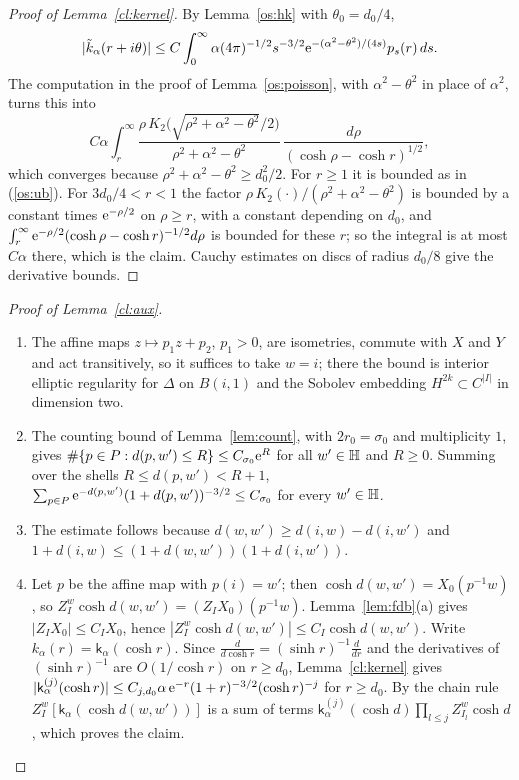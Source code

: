 \begin{proof}[Proof of Lemma~\ref{cl:kernel}]
By Lemma~\ref{os:hk} with $\theta_0=d_0/4$,
\[
|\tilde k_\alpha(r+i\theta)|\le C\int_0^\infty\alpha(4\pi)^{-1/2}s^{-3/2}\mathrm{e}^{-(\alpha^2-\theta^2)/(4s)}p_s(r)\,ds .
\]
The computation in the proof of Lemma~\ref{os:poisson}, with $\alpha^2-\theta^2$ in place of $\alpha^2$, turns this into
\[
C\alpha\int_r^\infty\frac{\rho\,K_2\bigl(\sqrt{\rho^2+\alpha^2-\theta^2}/2\bigr)}{\rho^2+\alpha^2-\theta^2}\,\frac{d\rho}{(\cosh\rho-\cosh r)^{1/2}},
\]
which converges because $\rho^2+\alpha^2-\theta^2\ge d_0^2/2$. For $r\ge1$ it is bounded as in \textup{(\ref{os:ub})}. For $3d_0/4<r<1$ the factor
$\rho\,K_2(\cdot)/(\rho^2+\alpha^2-\theta^2)$ is bounded by a constant times $\mathrm{e}^{-\rho/2}$ on $\rho\ge r$, with a constant depending on $d_0$, and
$\int_r^\infty\mathrm{e}^{-\rho/2}(\cosh\rho-\cosh r)^{-1/2}d\rho$ is bounded for these $r$; so the integral is at most $C\alpha$ there, which is the claim. Cauchy estimates on discs of radius $d_0/8$ give the derivative bounds.
\end{proof}

\begin{proof}[Proof of Lemma~\ref{cl:aux}]
\begin{enumerate}
\item[(a)] The affine maps $z\mapsto p_1z+p_2$,
$p_1>0$, are isometries, commute with $X$ and $Y$ and act transitively, so it suffices to take $w=i$; there the bound is interior elliptic regularity for
$\Delta$ on $B(i,1)$ and the Sobolev embedding $H^{2k}\subset C^{|I|}$ in dimension two.
\item[(b)] The counting bound of Lemma~\ref{lem:count}, with $2r_0=\sigma_0$ and multiplicity $1$, gives $\#\{p\in P:d(p,w')\le R\}\le C_{\sigma_0}\mathrm{e}^R$
for all $w'\in\mathbb{H}$ and $R\ge0$. Summing over the shells
$R\le d(p,w')<R+1$, $\sum_{p\in P}\mathrm{e}^{-d(p,w')}(1+d(p,w'))^{-3/2}\le C_{\sigma_0}$ for every $w'\in\mathbb{H}$.
\item[(c)] The estimate follows because $d(w,w')\ge d(i,w)-d(i,w')$ and
$1+d(i,w)\le(1+d(w,w'))(1+d(i,w'))$.
\item[(d)] Let $p$ be the affine map with $p(i)=w'$; then
$\cosh d(w,w')=X_0(p^{-1}w)$, so $Z_I^w\cosh d(w,w')=(Z_IX_0)(p^{-1}w)$. Lemma~\ref{lem:fdb}(a) gives $|Z_IX_0|\le C_IX_0$, hence $|Z_I^w\cosh d(w,w')|\le C_I\cosh d(w,w')$. Write $k_\alpha(r)=\mathsf k_\alpha(\cosh r)$. Since
$\tfrac{d}{d\cosh r}=(\sinh r)^{-1}\tfrac d{dr}$ and the derivatives of $(\sinh r)^{-1}$ are $O(1/\cosh r)$ on $r\ge d_0$, Lemma~\ref{cl:kernel} gives
$|\mathsf k_\alpha^{(j)}(\cosh r)|\le C_{j,d_0}\alpha\,\mathrm{e}^{-r}(1+r)^{-3/2}(\cosh r)^{-j}$ for $r\ge d_0$. By the chain rule $Z_I^w[\mathsf k_\alpha(\cosh d(w,w'))]$ is a sum
of terms $\mathsf k_\alpha^{(j)}(\cosh d)\prod_{l\le j}Z_{I_l}^w\cosh d$, which proves the claim.
\end{enumerate}
\end{proof}
